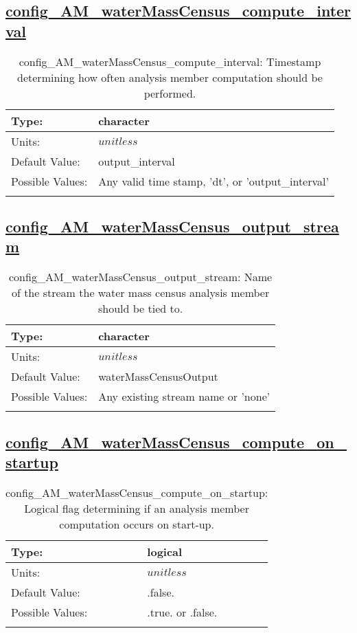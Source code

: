\subsection[config\_AM\_waterMassCensus\_compute\_interval]{\hyperref[sec:nm_tab_AM_waterMassCensus]{config\_AM\_waterMassCensus\_compute\_interval}}
\label{subsec:nm_sec_config_AM_waterMassCensus_compute_interval}
\begin{center}
\begin{longtable}{| p{2.0in} || p{4.0in} |}
    \hline
    Type: & character \\
    \hline
    Units: & $unitless$ \\
    \hline
    Default Value: & output\_interval \\
    \hline
    Possible Values: & Any valid time stamp, 'dt', or 'output\_interval' \\
    \hline
    \caption{config\_AM\_waterMassCensus\_compute\_interval: Timestamp determining how often analysis member computation should be performed.}
\end{longtable}
\end{center}
\subsection[config\_AM\_waterMassCensus\_output\_stream]{\hyperref[sec:nm_tab_AM_waterMassCensus]{config\_AM\_waterMassCensus\_output\_stream}}
\label{subsec:nm_sec_config_AM_waterMassCensus_output_stream}
\begin{center}
\begin{longtable}{| p{2.0in} || p{4.0in} |}
    \hline
    Type: & character \\
    \hline
    Units: & $unitless$ \\
    \hline
    Default Value: & waterMassCensusOutput \\
    \hline
    Possible Values: & Any existing stream name or 'none' \\
    \hline
    \caption{config\_AM\_waterMassCensus\_output\_stream: Name of the stream the water mass census analysis member should be tied to.}
\end{longtable}
\end{center}
\subsection[config\_AM\_waterMassCensus\_compute\_on\_startup]{\hyperref[sec:nm_tab_AM_waterMassCensus]{config\_AM\_waterMassCensus\_compute\_on\_startup}}
\label{subsec:nm_sec_config_AM_waterMassCensus_compute_on_startup}
\begin{center}
\begin{longtable}{| p{2.0in} || p{4.0in} |}
    \hline
    Type: & logical \\
    \hline
    Units: & $unitless$ \\
    \hline
    Default Value: & .false. \\
    \hline
    Possible Values: & .true. or .false. \\
    \hline
    \caption{config\_AM\_waterMassCensus\_compute\_on\_startup: Logical flag determining if an analysis member computation occurs on start-up.}
\end{longtable}
\end{center}
